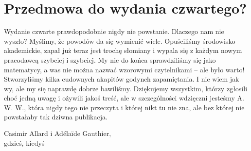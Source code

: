 \section*{Przedmowa do wydania czwartego?}

Wydanie czwarte prawdopodobnie nigdy nie powstanie.
Dlaczego nam nie wyszło? 
Myślimy, że powodów da się wymienić wiele.
Opuściliśmy środowisko akademickie, zapał już teraz jest trochę słomiany i wypala się z każdym nowym pracodawcą szybciej i szybciej.
My nie do końca sprawdziliśmy się jako matematycy, a was nie można nazwać wzorowymi czytelnikami -- ale było warto!
Stworzyliśmy kilka cudownych akapitów godynch zapamiętania.
I nie wiem jak wy, ale my się naprawdę dobrze bawiliśmy.
Dziękujemy wszystkim, którzy zgłosili choć jedną uwagę i ożywili jakoś treść, ale w szczególności wdzięczni jesteśmy A. W. W., która nigdy tego nie przeczyta i której nikt tu nie zna, ale bez której nie powstałaby tak dziwna publikacja.

\begin{flushright}
Casimir Allard i Adélaïde Gauthier,\\gdzieś, kiedyś
\end{flushright}


